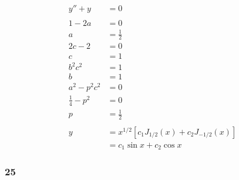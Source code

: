 \documentclass{article}
\begin{document}
\begin{align*}
  y'' + y           & = 0                                                \\ \\
  1 - 2 a           & = 0                                                \\
  a                 & = \frac{1}{2}                                      \\
  2 c - 2           & = 0                                                \\
  c                 & = 1                                                \\
  b^2 c^2           & = 1                                                \\
  b                 & = 1                                                \\
  a^2 - p^2 c^2     & = 0                                                \\
  \frac{1}{4} - p^2 & = 0                                                \\
  p                 & = \frac{1}{2}                                      \\ \\
  y                 & = x^{1 / 2} [c_1 J_{1 / 2}(x) + c_2 J_{-1 / 2}(x)] \\
                    & = c_1 \sin x + c_2 \cos x
\end{align*}

\subsubsection{25}
\end{document}
